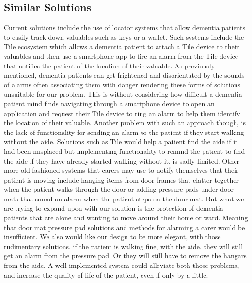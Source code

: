         \subsection{Similar Solutions}
            Current solutions include the use of locator systems that allow dementia patients to easily track down
            valuables such as keys or a wallet. Such systems include the Tile ecosystem which allows a dementia patient
            to attach a Tile device to their valuables and then use a smartphone app to fire an alarm from the Tile
            device that notifies the patient of the location of their valuable. As previously mentioned, dementia
            patients can get frightened and disorientated by the sounds of alarms often associating them with danger
            rendering these forms of solutions unsuitable for our problem. This is without considering how difficult a
            dementia patient mind finds navigating through a smartphone device to open an application and request their
            Tile device to ring an alarm to help them identify the location of their valuable. Another problem with such
            an approach though, is the lack of functionality for sending an alarm to the patient if they start walking
            without the aide. Solutions such as Tile would help a patient find the aide if it had been misplaced but
            implementing functionality to remind the patient to find the aide if they have already started walking
            without it, is sadly limited. Other more old-fashioned systems that carers may use to notify themselves that
            their patient is moving include hanging items from door frames that clatter together when the patient walks
            through the door or adding pressure pads under door mats that sound an alarm when the patient steps on the
            door mat. But what we are trying to expand upon with our solution is the protection of dementia patients
            that are alone and wanting to move around their home or ward. Meaning that door mat pressure pad solutions
            and methods for alarming a carer would be insufficient. We also would like our design to be more elegant,
            with those rudimentary solutions, if the patient is walking fine, with the aide, they will still get an
            alarm from the pressure pad. Or they will still have to remove the hangars from the aide. A well implemented
            system could alleviate both those problems, and increase the quality of life of the patient, even if only by
            a little.

